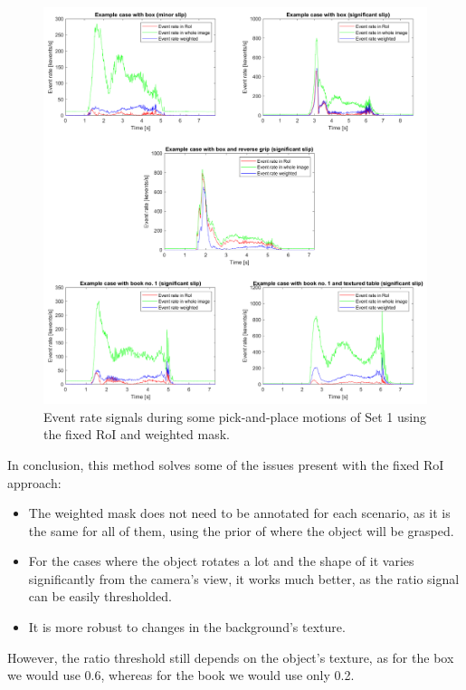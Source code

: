\begin{figure}[H]
    \centering
    \includegraphics[width=\textwidth]{resources/images/fix_mask_evr}
    \caption{Event rate signals during some pick-and-place motions of Set 1 using the fixed RoI and weighted mask.}\label{fig:fix_mask_evr}
\end{figure}

In conclusion, this method solves some of the issues present with the fixed RoI approach:

\begin{itemize}
	\item The weighted mask does not need to be annotated for each scenario, as it is the same for all of them, using the prior of where the object will be grasped.
	\item For the cases where the object rotates a lot and the shape of it varies significantly from the camera's view, it works much better, as the ratio signal can be easily thresholded.
	\item It is more robust to changes in the background's texture.
\end{itemize}

However, the ratio threshold still depends on the object's texture, as for the box we would use 0.6, whereas for the book we would use only 0.2.

